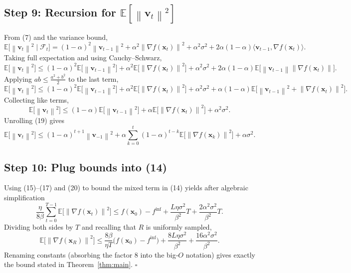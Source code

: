 \documentclass{article}
\newcommand{\E}{\mathbb{E}}
\newcommand{\norm}[1]{\left\|#1\right\|}
\newcommand{\grad}{\nabla}
\begin{document}
\subsection*{Step 9: Recursion for $\E[\norm{\mathbf{v}_{t}}^{2}]$}
From (7) and the variance bound,
\[
\E\!\bigl[\norm{\mathbf{v}_t}^{2}\mid\mathcal{F}_t\bigr]
= (1-\alpha)^{2}\norm{\mathbf{v}_{t-1}}^{2}
   +\alpha^{2}\norm{\grad f(\mathbf{x}_t)}^{2}
   +\alpha^{2}\sigma^{2}
   +2\alpha(1-\alpha)\langle\mathbf{v}_{t-1},\grad f(\mathbf{x}_t)\rangle .
\]
Taking full expectation and using Cauchy–Schwarz,
\[
\E\!\bigl[\norm{\mathbf{v}_t}^{2}\bigr]
\le (1-\alpha)^{2}\E\!\bigl[\norm{\mathbf{v}_{t-1}}^{2}\bigr]
   +\alpha^{2}\E\!\bigl[\norm{\grad f(\mathbf{x}_t)}^{2}\bigr]
   +\alpha^{2}\sigma^{2}
   +2\alpha(1-\alpha)\E\!\bigl[\norm{\mathbf{v}_{t-1}}\norm{\grad f(\mathbf{x}_t)}\bigr].
\tag{18}
\]
Applying $ab\le\frac{a^{2}+b^{2}}{2}$ to the last term,
\[
\E\!\bigl[\norm{\mathbf{v}_t}^{2}\bigr]
\le (1-\alpha)^{2}\E\!\bigl[\norm{\mathbf{v}_{t-1}}^{2}\bigr]
   +\alpha^{2}\E\!\bigl[\norm{\grad f(\mathbf{x}_t)}^{2}\bigr]
   +\alpha^{2}\sigma^{2}
   +\alpha(1-\alpha)\E\!\bigl[\norm{\mathbf{v}_{t-1}}^{2}+\norm{\grad f(\mathbf{x}_t)}^{2}\bigr].
\]
Collecting like terms,
\[
\E\!\bigl[\norm{\mathbf{v}_t}^{2}\bigr]
\le (1-\alpha)\E\!\bigl[\norm{\mathbf{v}_{t-1}}^{2}\bigr]
   +\alpha\E\!\bigl[\norm{\grad f(\mathbf{x}_t)}^{2}\bigr]
   +\alpha^{2}\sigma^{2}.
\tag{19}
\]
Unrolling (19) gives
\[
\E\!\bigl[\norm{\mathbf{v}_t}^{2}\bigr]
\le (1-\alpha)^{t+1}\norm{\mathbf{v}_{-1}}^{2}
   +\alpha\sum_{k=0}^{t}(1-\alpha)^{t-k}\E\!\bigl[\norm{\grad f(\mathbf{x}_k)}^{2}\bigr]
   +\alpha\sigma^{2}.
\tag{20}
\]

\subsection*{Step 10: Plug bounds into (14)}
Using (15)–(17) and (20) to bound the mixed term in (14) yields after algebraic simplification
\[
\frac{\eta}{8\beta}\sum_{t=0}^{T-1}\E\!\bigl[\norm{\grad f(\mathbf{x}_t)}^{2}\bigr]
\le f(\mathbf{x}_0)-f^{\inf}
   +\frac{L\eta\sigma^{2}}{\beta^{2}}T
   +\frac{2\alpha^{2}\sigma^{2}}{\beta^{2}}T .
\tag{21}
\]
Dividing both sides by $T$ and recalling that $R$ is uniformly sampled,
\[
\E\!\bigl[\norm{\grad f(\mathbf{x}_{R})}^{2}\bigr]
\le \frac{8\beta}{\eta T}\bigl(f(\mathbf{x}_0)-f^{\inf}\bigr)
   +\frac{8L\eta\sigma^{2}}{\beta^{2}}
   +\frac{16\alpha^{2}\sigma^{2}}{\beta^{2}} .
\tag{22}
\]
Renaming constants (absorbing the factor $8$ into the big‑$O$ notation) gives exactly the bound stated in Theorem~\ref{thm:main}. \hfill $\square$
\end{document}
